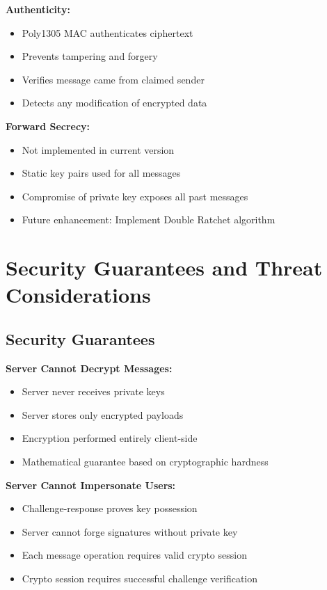\textbf{Authenticity:}
\begin{itemize}
    \item Poly1305 MAC authenticates ciphertext
    \item Prevents tampering and forgery
    \item Verifies message came from claimed sender
    \item Detects any modification of encrypted data
\end{itemize}

\textbf{Forward Secrecy:}
\begin{itemize}
    \item Not implemented in current version
    \item Static key pairs used for all messages
    \item Compromise of private key exposes all past messages
    \item Future enhancement: Implement Double Ratchet algorithm
\end{itemize}

\section{Security Guarantees and Threat Considerations}

\subsection{Security Guarantees}

\textbf{Server Cannot Decrypt Messages:}
\begin{itemize}
    \item Server never receives private keys
    \item Server stores only encrypted payloads
    \item Encryption performed entirely client-side
    \item Mathematical guarantee based on cryptographic hardness
\end{itemize}

\textbf{Server Cannot Impersonate Users:}
\begin{itemize}
    \item Challenge-response proves key possession
    \item Server cannot forge signatures without private key
    \item Each message operation requires valid crypto session
    \item Crypto session requires successful challenge verification
\end{itemize}

